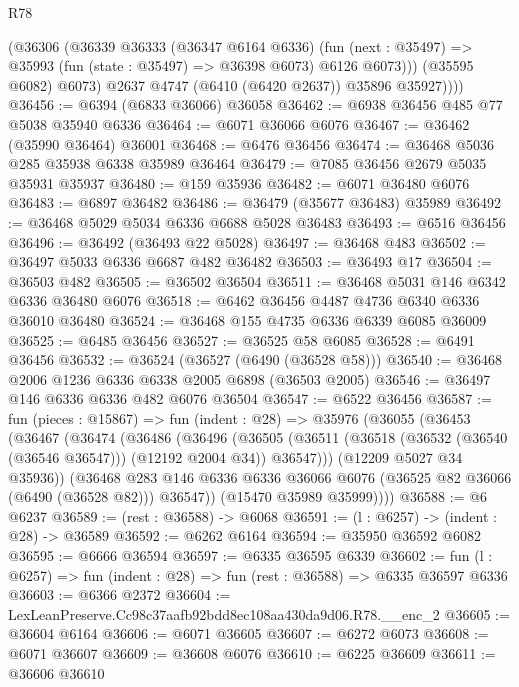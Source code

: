 \begin{lexlean}{R78}
\begin{coremodule}
              (@36306
                (@36339
                  @36333
                  (@36347 @6164 @6336)
                  (fun (next : @35497) =>
                  @35993 (fun (state : @35497) => @36398 @6073) @6126 @6073)))
              (@35595 @6082)
              @6073)
            @2637
            @4747
            (@6410 (@6420 @2637))
            @35896
            @35927))))
@36456 := @6394 (@6833 @36066) @36058
@36462 := @6938 @36456 @485 @77 @5038 @35940 @6336
@36464 := @6071 @36066 @6076
@36467 := @36462 (@35990 @36464) @36001
@36468 := @6476 @36456
@36474 := @36468 @5036 @285 @35938 @6338 @35989 @36464
@36479 := @7085 @36456 @2679 @5035 @35931 @35937
@36480 := @159 @35936
@36482 := @6071 @36480 @6076
@36483 := @6897 @36482
@36486 := @36479 (@35677 @36483) @35989
@36492 := @36468 @5029 @5034 @6336 @6688 @5028 @36483
@36493 := @6516 @36456
@36496 := @36492 (@36493 @22 @5028)
@36497 := @36468 @483
@36502 := @36497 @5033 @6336 @6687 @482 @36482
@36503 := @36493 @17
@36504 := @36503 @482
@36505 := @36502 @36504
@36511 := @36468 @5031 @146 @6342 @6336 @36480 @6076
@36518 := @6462 @36456 @4487 @4736 @6340 @6336 @36010 @36480
@36524 := @36468 @155 @4735 @6336 @6339 @6085 @36009
@36525 := @6485 @36456
@36527 := @36525 @58 @6085
@36528 := @6491 @36456
@36532 := @36524 (@36527 (@6490 (@36528 @58)))
@36540 := @36468 @2006 @1236 @6336 @6338 @2005 @6898 (@36503 @2005)
@36546 := @36497 @146 @6336 @6336 @482 @6076 @36504
@36547 := @6522 @36456
@36587 := fun (pieces : @15867) =>
  fun (indent : @28) =>
  @35976
    (@36055
      (@36453
        (@36467
          (@36474
            (@36486
              (@36496
                (@36505
                  (@36511 (@36518 (@36532 (@36540 (@36546 @36547))) (@12192 @2004 @34)) @36547)))
              (@12209 @5027 @34 @35936))
            (@36468
              @283
              @146
              @6336
              @6336
              @36066
              @6076
              (@36525 @82 @36066 (@6490 (@36528 @82)))
              @36547))
          (@15470 @35989 @35999))))
@36588 := @6 @6237
@36589 := (rest : @36588) -> @6068
@36591 := (l : @6257) -> (indent : @28) -> @36589
@36592 := @6262 @6164
@36594 := @35950 @36592 @6082
@36595 := @6666 @36594
@36597 := @6335 @36595 @6339
@36602 := fun (l : @6257) => fun (indent : @28) => fun (rest : @36588) => @6335 @36597 @6336
@36603 := @6366 @2372
@36604 := LexLeanPreserve.Cc98c37aafb92bdd8ec108aa430da9d06.R78.__enc_2
@36605 := @36604 @6164
@36606 := @6071 @36605
@36607 := @6272 @6073
@36608 := @6071 @36607
@36609 := @36608 @6076
@36610 := @6225 @36609
@36611 := @36606 @36610

\end{coremodule}
\end{lexlean}
